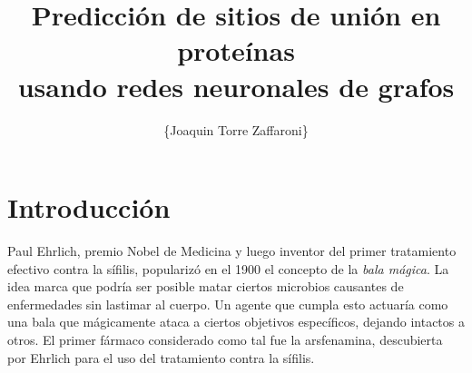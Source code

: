 \documentclass[
    left=2.0cm,         %
    right=2.0cm,        %
    top=2.0cm,          %
    bottom=2.5cm,         %
    bindingoffset=6mm,  %
    nohyphenation=false %
]{eiti/eiti-thesis}
\begin{document}
\EngineerThesis %
{}
\title{
    Predicción de sitios de unión en proteínas \\
    usando redes neuronales de grafos
}
\author{\{Joaquin Torre Zaffaroni\}}
\date{\the\year}
\maketitle




\tableofcontents
\newpage


\section{Introducción}



Paul Ehrlich, premio Nobel de Medicina y luego inventor del primer tratamiento 
efectivo contra la sífilis, popularizó en el 1900 el concepto de la \textit{bala mágica}.
La idea marca que podría ser posible matar ciertos microbios causantes de enfermedades
sin lastimar al cuerpo. Un agente que cumpla esto actuaría como una bala que mágicamente
ataca a ciertos objetivos específicos, dejando intactos a otros. El primer fármaco
considerado como tal fue la arsfenamina, descubierta por Ehrlich para el uso del
tratamiento contra la sífilis. 
\end{document}
